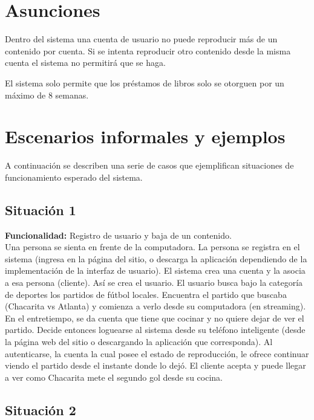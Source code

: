 \documentclass[11pt, a4paper, spanish]{article}
\begin{document}
\section{Asunciones}

	Dentro del sistema una cuenta de usuario no puede reproducir m\'as de un contenido por cuenta.
	Si se intenta reproducir otro contenido desde la misma cuenta el sistema no permitir\'a que se haga. 

	El sistema solo permite que los pr\'estamos de libros solo se otorguen por un m\'aximo de 8 semanas.

\newpage

\section{Escenarios informales y ejemplos}
	
	A continuaci\'on se describen una serie de casos que ejemplifican situaciones de funcionamiento esperado del sistema.

\subsection{Situaci\'on 1}

	\textbf{Funcionalidad:} Registro de usuario y baja de un contenido.\\

        Una persona se sienta en frente de la computadora.
    La persona se registra en el sistema (ingresa en la p\'agina del sitio, o descarga 
    la aplicaci\'on dependiendo de la implementaci\'on  de la interfaz de usuario).
    El sistema crea una cuenta y la asocia a esa persona (cliente). As\'i se crea el usuario.
    El usuario busca bajo la categor\'ia de deportes los partidos de f\'utbol locales.
    Encuentra el partido que buscaba (Chacarita vs Atlanta) y comienza a verlo desde su computadora (en streaming).\\

        En el entretiempo, se da cuenta que tiene que cocinar y no quiere dejar de ver el partido. Decide entonces loguearse al sistema desde su 
    tel\'efono inteligente (desde la p\'agina web del sitio o descargando la aplicaci\'on que corresponda). 
    Al autenticarse, la cuenta la cual posee el estado de reproducci\'on, le ofrece continuar viendo el partido desde el instante donde lo dej\'o.
    El cliente acepta y puede llegar a ver como Chacarita mete el segundo gol desde su cocina.

\subsection{Situaci\'on 2}
\end{document}
